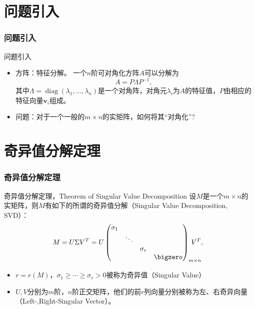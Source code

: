 \section{问题引入} %
\begin{frame}
\frametitle{问题引入}

\begin{block}{问题引入}
\begin{itemize}
\item<1-> 方阵：特征分解。\newline
一个$n$阶可对角化方阵$A$可以分解为
\[A = P\Lambda P^{-1},\]
其中$\Lambda = \operatorname{diag}(\lambda_1,\ldots,\lambda_n)$是一个{\color{red}对角阵}，对角元$\lambda_i$为$A$的特征值，$P$由相应的特征向量$\mathbf{v}_i$组成。\newline

\item<2-> 问题：对于一个一般的$m\times n$的实矩阵，如何将其``对角化''?
\end{itemize}
\end{block}

\end{frame}


\section{奇异值分解定理}


\begin{frame}
\frametitle{奇异值分解定理}

\begin{block}{奇异值分解定理，Theorem of Singular Value Decomposition}
设$M$是一个$m\times n$的实矩阵，则$M$有如下的所谓的奇异值分解（Singular Value Decomposition, SVD）：
\[M = U\Sigma V^T = U\begin{pmatrix}
\sigma_1 & & & \\ & \ddots & & \\ & & \sigma_r & \\ & & & \bigzero \end{pmatrix}_{m\times n}\!\!\!\!\!\!\!\!\!\! V^T,\]
\pause
\begin{itemize}
\item $r = r(M)$，$\sigma_1 \geqslant \cdots \geqslant \sigma_r > 0$被称为奇异值（Singular Value）
\item $U,V$分别为$m$阶，$n$阶正交矩阵，他们的前$r$列向量分别被称为左、右奇异向量（Left-,Right-Singular Vector）。
\end{itemize}
\end{block}

\end{frame}

